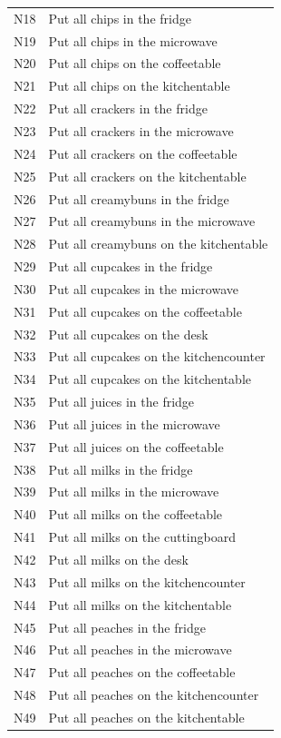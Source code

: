 {\begin{longtable}{lp{.85\linewidth}}
N18 & Put all chips in the fridge \\
N19 & Put all chips in the microwave \\
N20 & Put all chips on the coffeetable \\
N21 & Put all chips on the kitchentable \\
N22 & Put all crackers in the fridge \\
N23 & Put all crackers in the microwave \\
N24 & Put all crackers on the coffeetable \\
N25 & Put all crackers on the kitchentable \\
N26 & Put all creamybuns in the fridge \\
N27 & Put all creamybuns in the microwave \\
N28 & Put all creamybuns on the kitchentable \\
N29 & Put all cupcakes in the fridge \\
N30 & Put all cupcakes in the microwave \\
N31 & Put all cupcakes on the coffeetable \\
N32 & Put all cupcakes on the desk \\
N33 & Put all cupcakes on the kitchencounter \\
N34 & Put all cupcakes on the kitchentable \\
N35 & Put all juices in the fridge \\
N36 & Put all juices in the microwave \\
N37 & Put all juices on the coffeetable \\
N38 & Put all milks in the fridge \\
N39 & Put all milks in the microwave \\
N40 & Put all milks on the coffeetable \\
N41 & Put all milks on the cuttingboard \\
N42 & Put all milks on the desk \\
N43 & Put all milks on the kitchencounter \\
N44 & Put all milks on the kitchentable \\
N45 & Put all peaches in the fridge \\
N46 & Put all peaches in the microwave \\
N47 & Put all peaches on the coffeetable \\
N48 & Put all peaches on the kitchencounter \\
N49 & Put all peaches on the kitchentable \\

\end{longtable}}
